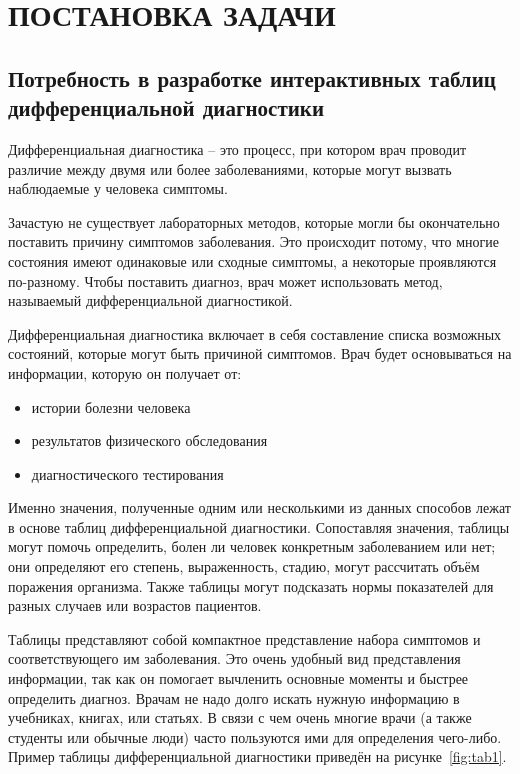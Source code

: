 \section{ПОСТАНОВКА ЗАДАЧИ}

\subsection{Потребность в разработке интерактивных таблиц дифференциальной диагностики}

Дифференциальная диагностика – это процесс, при котором врач проводит различие между двумя или более заболеваниями, которые могут вызвать наблюдаемые у человека симптомы.

Зачастую не существует лабораторных методов, которые могли бы окончательно поставить причину симптомов заболевания. Это происходит потому, что многие состояния имеют одинаковые или сходные симптомы, а некоторые проявляются по-разному. Чтобы поставить диагноз, врач может использовать метод, называемый дифференциальной диагностикой.

Дифференциальная диагностика включает в себя составление списка возможных состояний, которые могут быть причиной симптомов. Врач будет основываться на информации, которую он получает от:

\begin{itemize}
    \item истории болезни человека
    \item результатов физического обследования
    \item диагностического тестирования
\end{itemize}

Именно значения, полученные одним или несколькими из данных способов лежат в основе таблиц дифференциальной диагностики. Сопоставляя значения, таблицы могут помочь определить, болен ли человек конкретным заболеванием или нет; они определяют его степень, выраженность, стадию, могут рассчитать объём поражения организма. Также таблицы могут подсказать нормы показателей для разных случаев или возрастов пациентов.

Таблицы представляют собой компактное представление набора симптомов и соответствующего им заболевания. Это очень удобный вид представления информации, так как он помогает вычленить основные моменты и быстрее определить диагноз. Врачам не надо долго искать нужную информацию в учебниках, книгах, или статьях. В связи с чем очень многие врачи (а также студенты или обычные люди) часто пользуются ими для определения чего-либо. Пример таблицы дифференциальной диагностики приведён на рисунке~\ref{fig:tab1}.

